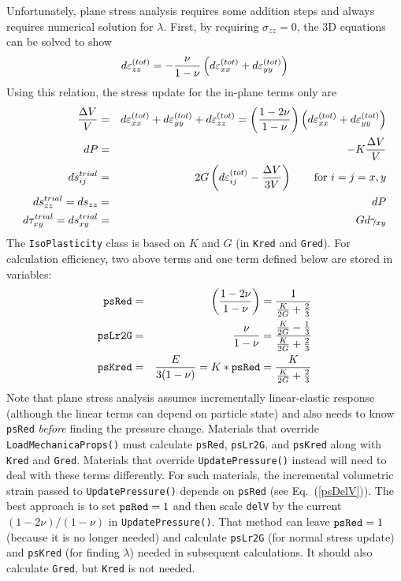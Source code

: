 \documentclass[11pt]{article}
\def\code#1{{\small\tt #1}}
\def\s#1{\sigma_{#1}}
\begin{document}
Unfortunately, plane stress analysis requires some addition steps and always requires numerical solution for $\lambda$. First, by requiring $\s{zz}=0$, the 3D equations can be solved to show
\begin{equation}
         d\varepsilon_{zz}^{(tot)} = - {\nu\over 1-\nu}\left(d\varepsilon_{xx}^{(tot)} + d\varepsilon_{yy}^{(tot)}\right)
\end{equation}
Using this relation, the stress update for the in-plane terms only are
\begin{eqnarray}
       {\Delta V\over V} & = & d\varepsilon_{xx}^{(tot)} + d\varepsilon_{yy}^{(tot)} + d\varepsilon_{zz}^{(tot)}
                             = \left(1-2\nu\over 1-\nu\right)\left(d\varepsilon_{xx}^{(tot)} + d\varepsilon_{yy}^{(tot)}\right)      \label{psDelV} \\
       dP & = & -K {\Delta V\over V} \\
       ds_{ij}^{trial} & = & 2G \left(d\varepsilon_{ij}^{(tot)} - {\Delta V\over 3V}\right)   \qquad {\rm for\ }i=j=x,y \\
       ds_{zz}^{trial} = ds_{zz} & = & dP \\
       d\tau_{xy}^{trial} = ds_{xy}^{trial} & = & G d\gamma_{xy} \\
\end{eqnarray}
The \code{IsoPlasticity} class is based on $K$ and $G$ (in \code{Kred} and \code{Gred}). For calculation efficiency, two above terms and one term defined below are stored in variables:
\begin{eqnarray}
       \code{psRed} & = & \left(1-2\nu\over 1-\nu\right) = {1 \over {K\over 2G} + {2\over 3}} \\
       \code{psLr2G} & = & {\nu\over 1-\nu} ={{K\over 2G} - {1\over 3} \over {K\over 2G} + {2\over 3}} \\
       \code{psKred} & = & {E\over 3(1-\nu)} = K*\code{psRed} = {K \over {K\over 2G} + {2\over 3}}
\end{eqnarray}
Note that plane stress analysis assumes incrementally linear-elastic response (although the linear terms can depend on particle state) and also needs to know \code{psRed}  \emph{before} finding the pressure change. Materials that override \code{LoadMechanicaProps()} must calculate \code{psRed}, \code{psLr2G}, and \code{psKred} along with \code{Kred} and \code{Gred}. Materials that override \code{UpdatePressure()} instead will need to deal with these terms differently. For such materials, the incremental volumetric strain passed to \code{UpdatePressure()} depends on \code{psRed} (see Eq.~(\ref{psDelV})). The best approach is to set $\code{psRed}=1$ and then scale \code{delV} by the current $(1-2\nu)/(1-\nu)$ in \code{UpdatePressure()}. That method can leave $\code{psRed}=1$ (because it is no longer needed) and calculate \code{psLr2G} (for normal stress update) and \code{psKred} (for finding $\lambda$) needed in subsequent calculations. It should also calculate \code{Gred}, but \code{Kred} is not needed.
\end{document}
